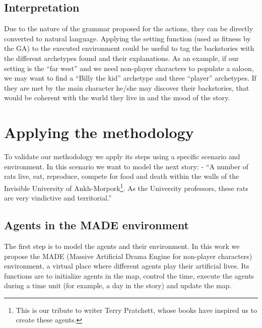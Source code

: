 \documentclass[letterpaper]{article}
\begin{document}
\subsection{Interpretation}


Due to the nature of the grammar proposed for the actions, they can be directly converted to natural language. Applying the setting function (used as fitness by the GA) to the executed environment could be useful to tag the backstories with the different archetypes found and their explanations. As an example, if our setting is the ``far west'' and we need non-player characters to populate a saloon, we may want to find a ``Billy the kid'' archetype and three ``player'' archetypes. If they are met by the main character he/she may discover their backstories, that would be coherent with the world they live in and the mood of the story.




\section{Applying the methodology}
\label{sec:applying}

To validate our methodology we apply its steps using a specific scenario and environment. In this scenario we want to model the next story: %
 - ``A number of rats live, eat, reproduce, compete for food and death within the walls of the Invisible University of Ankh-Morpork\footnote{This is our tribute to writer Terry Pratchett, whose books have inspired us to create these agents.}. As the University professors, these rats are very vindictive and territorial.''

\subsection{Agents in the MADE environment}

The first step is to model the agents and their environment. In this work we propose the MADE (Massive Artificial Drama Engine for non-player characters) environment, a virtual place where different agents play their artificial lives. Its functions are to initialize agents in the map, control the time, execute the agents during a time unit (for example, a day in the story) and update the map.
\end{document}

